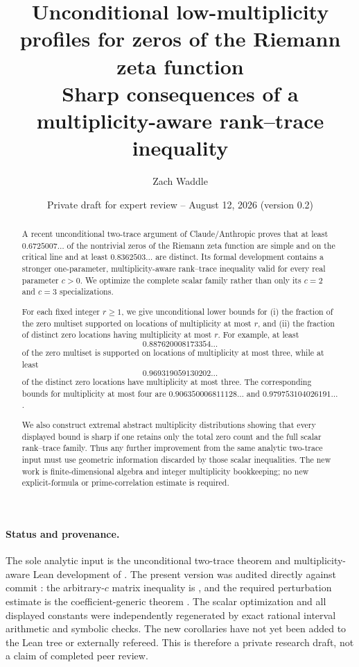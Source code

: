 \documentclass[11pt]{article}
\title{\textbf{Unconditional low-multiplicity profiles for zeros of the Riemann zeta function}\\[0.4em]
\large Sharp consequences of a multiplicity-aware rank--trace inequality}
\author{Zach Waddle}
\date{Private draft for expert review -- August 12, 2026 (version 0.2)}
\begin{document}
\maketitle

\begin{abstract}
A recent unconditional two-trace argument of Claude/Anthropic proves that at least
$0.6725007\ldots$ of the nontrivial zeros of the Riemann zeta function are simple and on the critical line and at least $0.8362503\ldots$ are distinct.  Its formal development contains a stronger one-parameter, multiplicity-aware rank--trace inequality valid for every real parameter $c>0$.  We optimize the complete scalar family rather than only its $c=2$ and $c=3$ specializations.

For each fixed integer $r\geq 1$, we give unconditional lower bounds for (i) the fraction of the zero multiset supported on locations of multiplicity at most $r$, and (ii) the fraction of distinct zero locations having multiplicity at most $r$.  For example, at least
\[
0.887620008173354\ldots
\]
of the zero multiset is supported on locations of multiplicity at most three, while at least
\[
0.969319059130202\ldots
\]
of the distinct zero locations have multiplicity at most three.  The corresponding bounds for multiplicity at most four are $0.906350006811128\ldots$ and $0.979753104026191\ldots$.

We also construct extremal abstract multiplicity distributions showing that every displayed bound is sharp if one retains only the total zero count and the full scalar rank--trace family.  Thus any further improvement from the same analytic two-trace input must use geometric information discarded by those scalar inequalities.  The new work is finite-dimensional algebra and integer multiplicity bookkeeping; no new explicit-formula or prime-correlation estimate is required.
\end{abstract}

\paragraph{Status and provenance.}
The sole analytic input is the unconditional two-trace theorem and multiplicity-aware Lean development of \cite{Claude2026}.  The present version was audited directly against commit : the arbitrary-$c$ matrix inequality is , and the required perturbation estimate is the coefficient-generic theorem .  The scalar optimization and all displayed constants were independently regenerated by exact rational interval arithmetic and symbolic checks.  The new corollaries have not yet been added to the Lean tree or externally refereed.  This is therefore a private research draft, not a claim of completed peer review.








\end{document}
